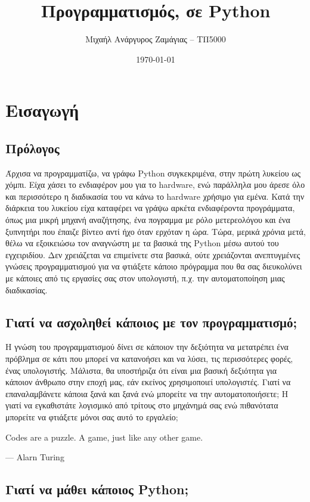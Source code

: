 \documentclass[12pt]{extreport}
\title{Προγραμματισμός, σε Python}
\author{Μιχαήλ Ανάργυρος Ζαμάγιας -- ΤΠ5000}
\date{\today}
\begin{document}
\maketitle

\tableofcontents
\newpage

\chapter{Εισαγωγή}
\newpage

\section{Πρόλογος}

Άρχισα να προγραμματίζω, να γράφω Python συγκεκριμένα, στην πρώτη λυκείου ως χόμπι. Είχα χάσει το ενδιαφέρον μου για το hardware, ενώ παράλληλα μου άρεσε όλο και περισσότερο η διαδικασία του να κάνω το hardware χρήσιμο για εμένα. Κατά την διάρκεια του λυκείου είχα καταφέρει να γράψω αρκέτα ενδιαφέροντα προγράμματα, όπως μια μικρή μηχανή αναζήτησης, ένα πογραμμα με ρόλο μετερεολόγου και ένα ξυπνητήρι που έπαιζε βίντεο αντί ήχο όταν ερχόταν η ώρα. Τώρα, μερικά χρόνια μετά, θέλω να εξοικειώσω τον αναγνώστη με τα βασικά της Python μέσω αυτού του εγχειριδίου. Δεν χρειάζεται να επιμείνετε στα βασικά, ούτε χρειάζονται ανεπτυγμένες γνώσεις προγραμματισμού για να φτιάξετε κάποιο πρόγραμμα που θα σας διευκολύνει με κάποιες από τις εργασίες σας στον υπολογιστή, π.χ. την αυτοματοποίηση μιας διαδικασίας.

\section{Γιατί να ασχοληθεί κάποιος με τον προγραμματισμό;}

Η γνώση του προγραμματισμού δίνει σε κάποιον την δεξιότητα να μετατρέπει ένα πρόβλημα σε κάτι που μπορεί να κατανοήσει και να λύσει, τις περισσότερες φορές, ένας υπολογιστής. Μάλιστα, θα υποστήριζα ότι είναι μια βασική δεξιότητα για κάποιον άνθρωπο στην εποχή μας, εάν εκείνος χρησιμοποιεί υπολογιστές. Γιατί να επαναλαμβάνετε κάποια ξανά και ξανά ενώ μπορείτε να την αυτοματοποιήσετε; Η γιατί να εγκαθιστάτε λογισμικό από τρίτους στο μηχάνημά σας ενώ πιθανότατα μπορείτε να φτιάξετε μόνοι σας αυτό το εργαλείο;

\epigraph{Codes are a puzzle. A game, just like any other game.}{--- Alarn Turing}

\section{Γιατί να μάθει κάποιος Python;}
\end{document}
